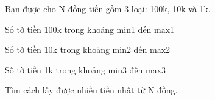 Bạn được cho N đồng tiền gồm 3 loại: 100k, 10k và 1k.

Số tờ tiền 100k trong khoảng min1 đến max1

Số tờ tiền 10k trong khoảng min2 đến max2

Số tờ tiền 1k trong khoảng min3 đến max3

Tìm cách lấy được nhiều tiền nhất từ N đồng.